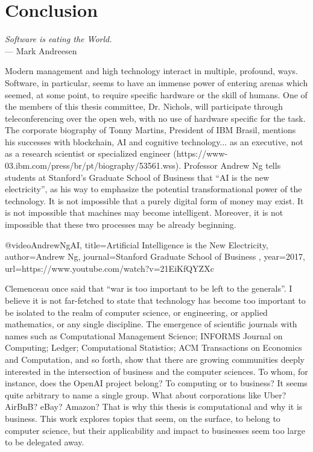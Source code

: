 \chapter{Conclusion}
\bigskip

\begin{flushright}{\slshape
	Software is eating the World.} \\ \medskip
    --- Mark Andreesen \citep{andreesen:2011}
\end{flushright}
\bigskip
\bigskip

\noindent Modern management and high technology interact in multiple, profound, ways.  Software, in particular, seems to have an immense power of entering arenas which seemed, at some point, to require specific hardware or the skill of humans.  One of the members of this thesis committee, Dr. Nichols, will participate through teleconferencing over the open web, with no use of hardware specific for the task.  The corporate biography of Tonny Martins, President of IBM Brasil, mentions his successes with blockchain, AI and cognitive technology... as an executive, not as a research scientist or specialized engineer (https://www-03.ibm.com/press/br/pt/biography/53561.wss). Professor Andrew Ng tells students at Stanford’s Graduate School of Business that “AI is the new electricity”, as his way to emphasize the potential transformational power of the technology.  It is not impossible that a purely digital form of money may exist.  It is not impossible that machines may become intelligent.  Moreover, it is not impossible that these two processes may be already beginning.  

@video{AndrewNgAI, 
  title={Artificial Intelligence is the New Electricity},
  author={Andrew Ng},
  journal={Stanford Graduate School of Business },
  year={2017},
  url={https://www.youtube.com/watch?v=21EiKfQYZXc}
}

Clemenceau once said that “war is too important to be left to the generals”.  I believe it is not far-fetched to state that technology has become too important to be isolated to the realm of computer science, or engineering, or applied mathematics, or any single discipline.  The emergence of scientific journals with names such as Computational Management Science; INFORMS Journal on Computing; Ledger; Computational Statistics; ACM Transactions on Economics and Computation, and so forth, show that there are growing communities deeply interested in the intersection of business and the computer sciences.  To whom, for instance, does the OpenAI project belong?  To computing or to business?  It seems quite arbitrary to name a single group. What about corporations like Uber?  AirBnB?  eBay?  Amazon? That is why this thesis is computational and why it is business.  This work explores topics that seem, on the surface, to belong to computer science, but their applicability and impact to businesses seem too large to be delegated away.  

